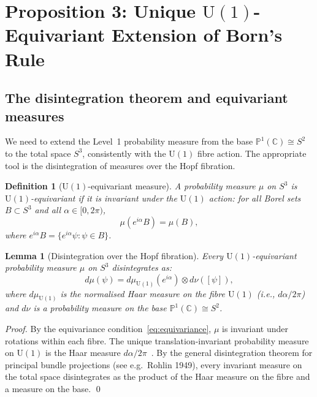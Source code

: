 \documentclass[12pt,a4paper]{article}
\newtheorem{lemma}[theorem]{Lemma}
\newtheorem{definition}[theorem]{Definition}
\newcommand{\CC}{\mathbb{C}}
\newcommand{\PP}{\mathbb{P}}
\begin{document}
\section{Proposition 3: Unique \texorpdfstring{$\mathrm{U}(1)$}{U(1)}-Equivariant Extension of Born's Rule}
\label{sec:born_extension}

\subsection{The disintegration theorem and equivariant measures}

We need to extend the Level~1 probability measure from the base $\PP^1(\CC) \cong S^2$
to the total space $S^3$, consistently with the $\mathrm{U}(1)$ fibre action. The
appropriate tool is the disintegration of measures over the Hopf fibration.

\begin{definition}[$\mathrm{U}(1)$-equivariant measure]
\label{def:equivariant_measure}
A probability measure $\mu$ on $S^3$ is \emph{$\mathrm{U}(1)$-equivariant} if it is
invariant under the $\mathrm{U}(1)$ action: for all Borel sets $B \subset S^3$ and all
$\alpha \in [0,2\pi)$,
\begin{equation}
\mu(e^{i\alpha} B) = \mu(B),
\label{eq:equivariance}
\end{equation}
where $e^{i\alpha} B = \{e^{i\alpha}\psi : \psi \in B\}$.
\end{definition}

\begin{lemma}[Disintegration over the Hopf fibration]
\label{lem:disintegration}
Every $\mathrm{U}(1)$-equivariant probability measure $\mu$ on $S^3$ disintegrates as:
\begin{equation}
d\mu(\psi) = d\mu_{\mathrm{U}(1)}(e^{i\alpha}) \otimes d\nu([\psi]),
\label{eq:disintegration}
\end{equation}
where $d\mu_{\mathrm{U}(1)}$ is the normalised Haar measure on the fibre $\mathrm{U}(1)$
(i.e., $d\alpha / 2\pi$) and $d\nu$ is a probability measure on the base
$\PP^1(\CC) \cong S^2$.
\end{lemma}

\begin{proof}
By the equivariance condition~\eqref{eq:equivariance}, $\mu$ is invariant under
rotations within each fibre. The unique translation-invariant probability measure on
$\mathrm{U}(1)$ is the Haar measure $d\alpha/2\pi$~\cite{Pontryagin_1939}. By the
general disintegration theorem for principal bundle projections (see e.g.\ Rohlin 1949),
every invariant measure on the total space disintegrates as the product of the Haar
measure on the fibre and a measure on the base. \qed
\end{proof}
\end{document}
